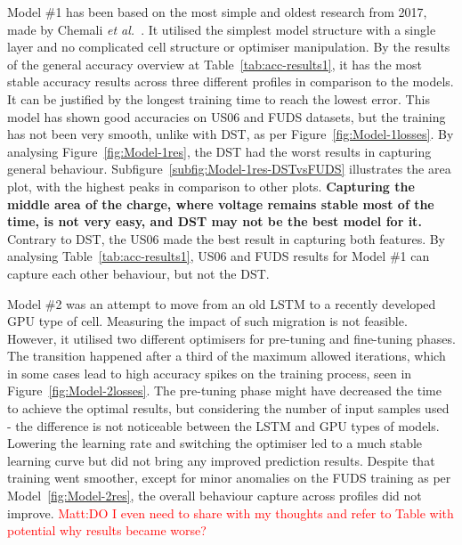 %
%
Model \#1 has been based on the most simple and oldest research from 2017, made by Chemali \textit{et al.}~\cite{Chemali2017}.
It utilised the simplest model structure with a single layer and no complicated cell structure or optimiser manipulation.
By the results of the general accuracy overview at Table~\ref{tab:acc-results1}, it has the most stable accuracy results across three different profiles in comparison to the models.
It can be justified by the longest training time to reach the lowest error.
This model has shown good accuracies on US06 and FUDS datasets, but the training has not been very smooth, unlike with DST, as per Figure~\ref{fig:Model-1losses}.
By analysing Figure~\ref{fig:Model-1res}, the DST had the worst results in capturing general behaviour. Subfigure~\ref{subfig:Model-1res-DSTvsFUDS} illustrates the area plot, with the highest peaks in comparison to other plots.
\textbf{Capturing the middle area of the charge, where voltage remains stable most of the time, is not very easy, and DST may not be the best model for it.}
Contrary to DST, the US06 made the best result in capturing both features.
By analysing Table~\ref{tab:acc-results1}, US06 and FUDS results for Model \#1 can capture each other behaviour, but not the DST.

%
%
Model \#2 was an attempt to move from an old LSTM to a recently developed GPU type of cell.
Measuring the impact of such migration is not feasible.
However, it utilised two different optimisers for pre-tuning and fine-tuning phases.
The transition happened after a third of the maximum allowed iterations, which in some cases lead to high accuracy spikes on the training process, seen in Figure~\ref{fig:Model-2losses}.
The pre-tuning phase might have decreased the time to achieve the optimal results, but considering the number of input samples used - the difference is not noticeable between the LSTM and GPU types of models.
Lowering the learning rate and switching the optimiser led to a much stable learning curve but did not bring any improved prediction results.
Despite that training went smoother, except for minor anomalies on the FUDS training as per Model~\ref{fig:Model-2res}, the overall behaviour capture across profiles did not improve.
\textcolor{red}{Matt:DO I even need to share with my thoughts and refer to Table with potential why results became worse?}

